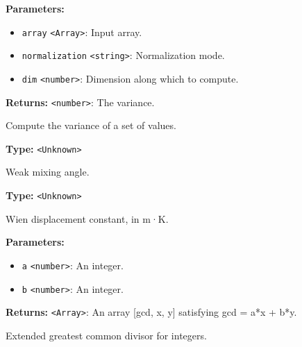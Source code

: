 \documentclass[12pt,a4paper]{article}
\begin{document}
\vspace{5mm}
\noindent {}


\noindent \textbf{Parameters:}
\begin{itemize}
  \item \texttt{array} \texttt{<Array>}: Input array.
  \item \texttt{normalization} \texttt{<string>}: Normalization mode.
  \item \texttt{dim} \texttt{<number>}: Dimension along which to compute.
\end{itemize}

\noindent \textbf{Returns:} \texttt{<number>}: The variance.

\noindent Compute the variance of a set of values.

\vspace{5mm}
\noindent {}\vspace{4mm}


\noindent \textbf{Type:} \texttt{<Unknown>}

\noindent Weak mixing angle.

\vspace{5mm}
\noindent {}\vspace{4mm}


\noindent \textbf{Type:} \texttt{<Unknown>}

\noindent Wien displacement constant, in m·K.

\vspace{5mm}
\noindent {}


\noindent \textbf{Parameters:}
\begin{itemize}
  \item \texttt{a} \texttt{<number>}: An integer.
  \item \texttt{b} \texttt{<number>}: An integer.
\end{itemize}

\noindent \textbf{Returns:} \texttt{<Array>}: An array [gcd, x, y] satisfying gcd = a*x + b*y.

\noindent Extended greatest common divisor for integers.
\end{document}
